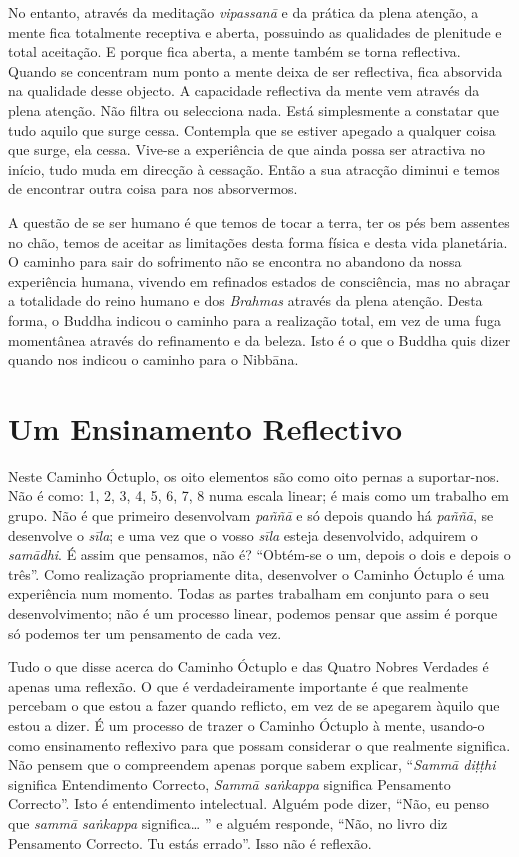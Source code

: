 No entanto, através da meditação \emph{vipassanā} e da prática da plena atenção,
a mente fica totalmente receptiva e aberta, possuindo as qualidades de plenitude
e total aceitação. E porque fica aberta, a mente também se torna reflectiva.
Quando se concentram num ponto a mente deixa de ser reflectiva, fica absorvida
na qualidade desse objecto. A capacidade reflectiva da mente vem através da
plena atenção. Não filtra ou selecciona nada. Está simplesmente a constatar que
tudo aquilo que surge cessa. Contempla que se estiver apegado a qualquer coisa
que surge, ela cessa. Vive-se a experiência de que ainda possa ser atractiva no
início, tudo muda em direcção à cessação. Então a sua atracção diminui e temos
de encontrar outra coisa para nos absorvermos.

A questão de se ser humano é que temos de tocar a terra, ter os pés bem assentes
no chão, temos de aceitar as limitações desta forma física e desta vida
planetária. O caminho para sair do sofrimento não se encontra no abandono da
nossa experiência humana, vivendo em refinados estados de consciência, mas no
abraçar a totalidade do reino humano e dos \emph{Brahmas} através da plena
atenção. Desta forma, o Buddha indicou o caminho para a realização total, em vez
de uma fuga momentânea através do refinamento e da beleza. Isto é o que o Buddha
quis dizer quando nos indicou o caminho para o Nibbāna.

\section{Um Ensinamento Reflectivo}

Neste Caminho Óctuplo, os oito elementos são como oito pernas a suportar-nos.
Não é como: 1, 2, 3, 4, 5, 6, 7, 8 numa escala linear; é mais como um trabalho
em grupo. Não é que primeiro desenvolvam \emph{paññā} e só depois quando há
\emph{paññā}, se desenvolve o \emph{sīla}; e uma vez que o vosso \emph{sīla}
esteja desenvolvido, adquirem o \emph{samādhi}. É assim que pensamos, não é?
“Obtém-se o um, depois o dois e depois o três”. Como realização propriamente
dita, desenvolver o Caminho Óctuplo é uma experiência num momento. Todas as
partes trabalham em conjunto para o seu desenvolvimento; não é um processo
linear, podemos pensar que assim é porque só podemos ter um pensamento de cada
vez.

Tudo o que disse acerca do Caminho Óctuplo e das Quatro Nobres Verdades é apenas
uma reflexão. O que é verdadeiramente importante é que realmente percebam o que
estou a fazer quando reflicto, em vez de se apegarem àquilo que estou a dizer. É
um processo de trazer o Caminho Óctuplo à mente, usando-o como ensinamento
reflexivo para que possam considerar o que realmente significa. Não pensem que o
compreendem apenas porque sabem explicar, “\emph{Sammā diṭṭhi} significa
Entendimento Correcto, \emph{Sammā saṅkappa} significa Pensamento Correcto”.
Isto é entendimento intelectual. Alguém pode dizer, “Não, eu penso que
\emph{sammā saṅkappa} significa\ldots{} ” e alguém responde, “Não, no livro diz
Pensamento Correcto. Tu estás errado”. Isso não é reflexão.


